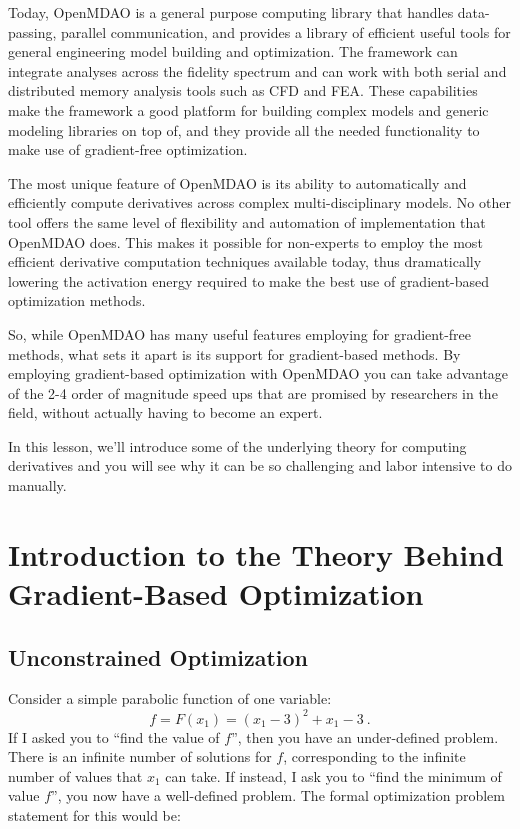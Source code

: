 \documentclass[conf]{new-aiaa}
\begin{document}
    Today, OpenMDAO is a general purpose computing library that handles data-passing, parallel communication, and provides a library of efficient useful tools for general engineering model building and optimization. 
    The framework can integrate analyses across the fidelity spectrum and can work with both serial and distributed memory analysis tools such as CFD and FEA. 
    These capabilities make the framework a good platform for building complex models and generic modeling libraries on top of, and they provide all the needed functionality to make use of gradient-free optimization. 

    The most unique feature of OpenMDAO is its ability to automatically and efficiently compute derivatives across complex multi-disciplinary models. 
    No other tool offers the same level of flexibility and automation of implementation that OpenMDAO does. 
    This makes it possible for non-experts to employ the most efficient derivative computation techniques available today, thus dramatically lowering the activation energy required to make the best use of gradient-based optimization methods. 

    So, while OpenMDAO has many useful features employing for gradient-free methods, what sets it apart is its support for gradient-based methods. 
    By employing gradient-based optimization with OpenMDAO you can take advantage of the 2-4 order of magnitude speed ups that are promised by researchers in the field, without actually having to become an expert. 

    In this lesson, we'll introduce some of the underlying theory for computing derivatives and you will see why it can be so challenging and labor intensive to do manually. 


\section{Introduction to the Theory Behind Gradient-Based Optimization}

    \subsection{Unconstrained Optimization}
    Consider a simple parabolic function of one variable: 
    \begin{equation}
        f = F(x_1) = (x_1 - 3)^2 + x_1 - 3 \ . 
    \end{equation}
    If I asked you to ``find the value of $f$'', then you have an under-defined problem. 
    There is an infinite number of solutions for $f$, corresponding to the infinite number of values that $x_1$ can take. 
    If instead, I ask you to ``find the minimum of value $f$'', you now have a well-defined problem.    
    The formal optimization problem statement for this would be: 
\end{document}
